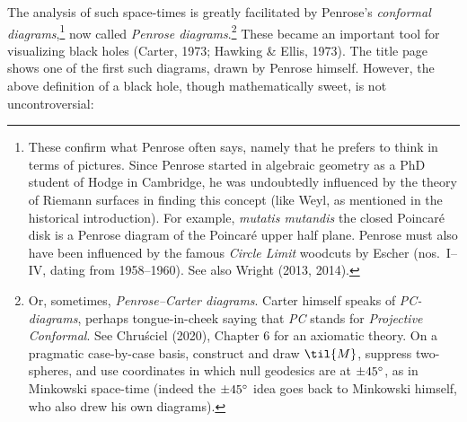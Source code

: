 \documentclass[12pt]{article}
\begin{document}
The analysis of such space-times is greatly facilitated by Penrose's \emph{conformal diagrams},\footnote{
 These confirm what Penrose often says, namely that he prefers to think in terms of pictures.
Since Penrose started  in algebraic geometry as a PhD student of Hodge in Cambridge, he was undoubtedly influenced by the theory of Riemann surfaces in finding this concept (like Weyl, as mentioned in the historical introduction). For example, \emph{mutatis mutandis} the closed Poincar\'{e} disk is a Penrose diagram of
the Poincar\'{e} upper half plane. Penrose must also have been influenced by the famous \emph{Circle Limit} woodcuts by Escher (nos.\ I--IV, dating from 1958--1960). See also Wright (2013, 2014). 
} now  called  
\emph{Penrose diagrams}.\footnote{Or, sometimes,  \emph{Penrose--Carter diagrams}. Carter himself speaks of \emph{PC-diagrams}, perhaps tongue-in-cheek saying that \emph{PC} stands for \emph{Projective Conformal}. See  Chru\'{s}ciel (2020), Chapter 6 for an axiomatic theory. On a pragmatic case-by-case basis, construct and draw  $\til{M}$,
 suppress two-spheres, and use coordinates in which null geodesics are at $\pm 45\degree$, as in Minkowski space-time (indeed the  $\pm 45\degree$ idea goes back to Minkowski himself, who also drew his own diagrams). 
}
These became an important tool for visualizing black holes (Carter, 1973; Hawking \& Ellis, 1973). The title page shows one of the first such diagrams, drawn by Penrose himself.
 \newpage
 However, the above definition of a black hole, though mathematically sweet, is not uncontroversial:
\end{document}
